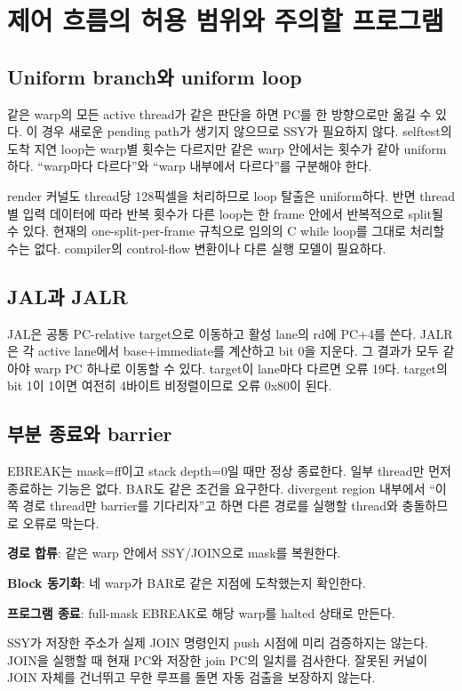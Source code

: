 \documentclass[a4paper,11pt]{article}
\newcommand{\chapterpage}[1]{\clearpage\section{#1}}
\begin{document}
\chapterpage{제어 흐름의 허용 범위와 주의할 프로그램}
\subsection{Uniform branch와 uniform loop}
같은 warp의 모든 active thread가 같은 판단을 하면 PC를 한 방향으로만 옮길 수 있다. 이 경우 새로운 pending path가 생기지 않으므로 SSY가 필요하지 않다. selftest의 도착 지연 loop는 warp별 횟수는 다르지만 같은 warp 안에서는 횟수가 같아 uniform하다. ``warp마다 다르다''와 ``warp 내부에서 다르다''를 구분해야 한다.

render 커널도 thread당 128픽셀을 처리하므로 loop 탈출은 uniform하다. 반면 thread별 입력 데이터에 따라 반복 횟수가 다른 loop는 한 frame 안에서 반복적으로 split될 수 있다. 현재의 one-split-per-frame 규칙으로 임의의 C while loop를 그대로 처리할 수는 없다. compiler의 control-flow 변환이나 다른 실행 모델이 필요하다.
\subsection{JAL과 JALR}
JAL은 공통 PC-relative target으로 이동하고 활성 lane의 rd에 PC+4를 쓴다. JALR은 각 active lane에서 base+immediate를 계산하고 bit 0을 지운다. 그 결과가 모두 같아야 warp PC 하나로 이동할 수 있다. target이 lane마다 다르면 오류 19다. target의 bit 1이 1이면 여전히 4바이트 비정렬이므로 오류 0x80이 된다.
\subsection{부분 종료와 barrier}
EBREAK는 mask=ff이고 stack depth=0일 때만 정상 종료한다. 일부 thread만 먼저 종료하는 기능은 없다. BAR도 같은 조건을 요구한다. divergent region 내부에서 ``이쪽 경로 thread만 barrier를 기다리자''고 하면 다른 경로를 실행할 thread와 충돌하므로 오류로 막는다.
\begin{keybox}[세 가지 다른 상황]
\textbf{경로 합류}: 같은 warp 안에서 SSY/JOIN으로 mask를 복원한다.\par
\textbf{Block 동기화}: 네 warp가 BAR로 같은 지점에 도착했는지 확인한다.\par
\textbf{프로그램 종료}: full-mask EBREAK로 해당 warp를 halted 상태로 만든다.
\end{keybox}
SSY가 저장한 주소가 실제 JOIN 명령인지 push 시점에 미리 검증하지는 않는다. JOIN을 실행할 때 현재 PC와 저장한 join PC의 일치를 검사한다. 잘못된 커널이 JOIN 자체를 건너뛰고 무한 루프를 돌면 자동 검출을 보장하지 않는다.
\end{document}
